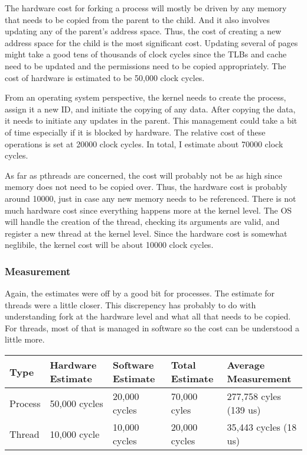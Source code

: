 \documentclass[paper=a4, fontsize=11pt]{scrartcl}
\numberwithin{equation}{section}        %
\numberwithin{figure}{section}          %
\numberwithin{table}{section}               %
\begin{document}
The hardware cost for forking a process will mostly be driven by any memory that needs to be copied from the parent to the child.  And it also involves updating any of the parent's address space.  Thus, the cost of creating a new address space for the child is the most significant cost.  Updating several of pages might take a good tens of thousands of clock cycles since the TLBs and cache need to be updated and the permissions need to be copied appropriately.  The cost of hardware is estimated to be 50,000 clock cycles.

From an operating system perspective, the kernel needs to create the process, assign it a new ID, and initiate the copying of any data.  After copying the data, it needs to initiate any updates in the parent.  This management could take a bit of time especially if it is blocked by hardware.  The relative cost of these operations is set at 20000 clock cycles.  In total, I estimate about 70000 clock cycles.

As far as pthreads are concerned, the cost will probably not be as high since memory does not need to be copied over.  Thus, the hardware cost is probably around 10000, just in case any new memory needs to be referenced.  There is not much hardware cost since everything happens more at the kernel level.  The OS will handle the creation of the thread, checking its arguments are valid, and register a new thread at the kernel level.  Since the hardware cost is somewhat neglibile, the kernel cost will be about 10000 clock cycles. 

\subsubsection{Measurement}

Again, the estimates were off by a good bit for processes.  The estimate for threads were a little closer.  This discrepency has probably to do with understanding fork at the hardware level and what all that needs to be copied.  For threads, most of that is managed in software so the cost can be understood a little more.

\begin{center}
    \begin{tabular}{ | l | l | l | l | l |}
    \hline
    Type & Hardware Estimate & Software Estimate & Total Estimate & Average Measurement \\      \hline
    Process & 50,000 cycles & 20,000 cycles & 70,000 cyles & 277,758 cyles (139 us) \\ 
    Thread & 10,000 cycle & 10,000 cycles & 20,000 cycles & 35,443 cycles (18 us) \\
    \hline
    \end{tabular}
\end{center}
\end{document}

